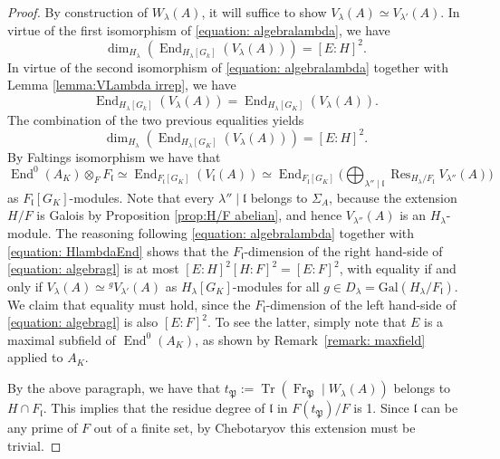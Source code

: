 \documentclass[oneside]{amsart}
\theoremstyle{remark}
\newcommand{\Gal}{\mathrm{Gal}}
\newcommand{\End}{\operatorname{End}}
\newcommand{\Frob}{\operatorname{Fr}}
\newcommand{\Res}{\operatorname{Res}}
\newcommand{\Tr}{\operatorname{Tr}}
\newcommand{\gl}{\mathfrak{l}}
\newcommand{\Pg}{\mathfrak{P}}
\numberwithin{equation}{section}
\begin{document}
\begin{proof}
By construction of $W_\lambda(A)$, it will suffice to show $V_\lambda(A)\simeq V_{\lambda'}(A)$.
In virtue of the first isomorphism of \eqref{equation: algebralambda}, we have 
\begin{equation}\label{equation: dimendk}
\dim_{H_\lambda}(\End_{H_\lambda[G_k]}(V_\lambda(A)))=[E:H]^2.
\end{equation}
In virtue of the second isomorphism of \eqref{equation: algebralambda} together with Lemma \ref{lemma:VLambda irrep}, we have
$$
\End_{H_\lambda[G_k]}(V_\lambda(A))=\End_{H_\lambda[G_K]}(V_\lambda(A)).
$$
The combination of the two previous equalities yields
\begin{equation}\label{equation: HlambdaEnd}
\dim_{H_\lambda}(\End_{H_\lambda[G_K]}(V_\lambda(A)))=[E:H]^2.
\end{equation}
By Faltings isomorphism we have that 
\begin{equation}\label{equation: algebragl}
\End^0(A_K)\otimes_F F_{\gl}\simeq \End_{F_\gl[G_K]}(V_\gl(A)) \simeq \End_{F_\gl[G_K]}\big( \bigoplus_{\lambda''\mid \gl} \Res_{H_{\lambda}/F_\gl} V_{\lambda''}(A)\big)\,
\end{equation}
as $F_\gl[G_K]$-modules. Note that every $\lambda''\mid\gl$ belongs to $\Sigma_A$, because the extension $H/F$ is Galois by Proposition \ref{prop:H/F abelian}, and hence $V_{\lambda''}(A)$ is an $H_\lambda$-module. The reasoning following \eqref{equation: algebralambda} together with \eqref{equation: HlambdaEnd} shows that the $F_\gl$-dimension of the right hand-side of \eqref{equation: algebragl} is at most $[E:H]^2[H:F]^2=[E:F]^2$, with equality if and only if $V_\lambda(A)\simeq {}^gV_{\lambda'}(A)$ as $H_\lambda[G_K]$-modules for all $g\in D_\lambda=\Gal(H_\lambda/F_\gl)$. We claim that equality must hold, since the $F_\gl$-dimension of the left hand-side of \eqref{equation: algebragl} is also $[E:F]^2$. To see the latter, simply note that $E$ is a maximal subfield of $\End^0(A_K)$, as shown by Remark~\ref{remark: maxfield} applied to $A_K$.

By the above paragraph, we have that $t_\Pg:=\Tr(\Frob_\Pg\mid W_\lambda(A))$ belongs to $H\cap F_\gl$. This implies that the residue degree of $\gl$ in $F(t_{\Pg})/F$ is 1. Since $\gl$ can be any prime of $F$ out of a finite set, by Chebotaryov this extension must be trivial.
\end{proof}
\end{document}
